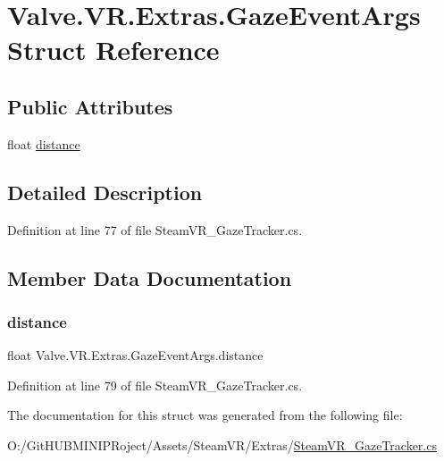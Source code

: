 \hypertarget{struct_valve_1_1_v_r_1_1_extras_1_1_gaze_event_args}{}\section{Valve.\+V\+R.\+Extras.\+Gaze\+Event\+Args Struct Reference}
\label{struct_valve_1_1_v_r_1_1_extras_1_1_gaze_event_args}
\subsection*{Public Attributes}
\begin{DoxyCompactItemize}
\item 
float \mbox{\hyperlink{struct_valve_1_1_v_r_1_1_extras_1_1_gaze_event_args_ab335058ba0388d6720303875a476f938}{distance}}
\end{DoxyCompactItemize}


\subsection{Detailed Description}


Definition at line 77 of file Steam\+V\+R\+\_\+\+Gaze\+Tracker.\+cs.



\subsection{Member Data Documentation}
\mbox{\label{struct_valve_1_1_v_r_1_1_extras_1_1_gaze_event_args_ab335058ba0388d6720303875a476f938}} 
\subsubsection{\texorpdfstring{distance}{distance}}
{\footnotesize\ttfamily float Valve.\+V\+R.\+Extras.\+Gaze\+Event\+Args.\+distance}



Definition at line 79 of file Steam\+V\+R\+\_\+\+Gaze\+Tracker.\+cs.



The documentation for this struct was generated from the following file\+:\begin{DoxyCompactItemize}
\item 
O\+:/\+Git\+H\+U\+B\+M\+I\+N\+I\+P\+Roject/\+Assets/\+Steam\+V\+R/\+Extras/\mbox{\hyperlink{_steam_v_r___gaze_tracker_8cs}{Steam\+V\+R\+\_\+\+Gaze\+Tracker.\+cs}}\end{DoxyCompactItemize}
